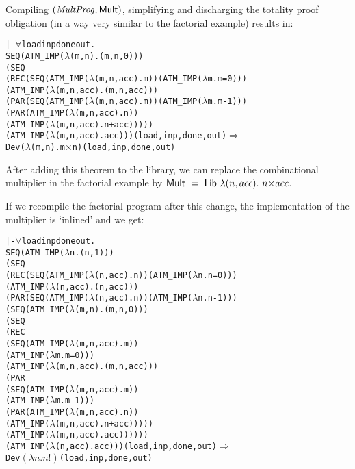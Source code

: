 \documentclass{llncs}
\begin{document}
Compiling $(\mathit{MultProg},\mathsf{Mult})$, simplifying and discharging
the totality proof obligation (in a way very similar to the factorial example) results in:

\vspace*{-2mm}

{\small\begin{alltt}
 |- \(\forall\)load inp done out.
      SEQ (ATM_IMP (\(\lambda\)(m,n). (m,n,0)))
        (SEQ
           (REC (SEQ (ATM_IMP (\(\lambda\)(m,n,acc). m)) (ATM_IMP (\(\lambda\)m. m = 0)))
              (ATM_IMP (\(\lambda\)(m,n,acc). (m,n,acc)))
              (PAR (SEQ (ATM_IMP (\(\lambda\)(m,n,acc). m)) (ATM_IMP (\(\lambda\)m. m - 1)))
                 (PAR (ATM_IMP (\(\lambda\)(m,n,acc). n))
                    (ATM_IMP (\(\lambda\)(m,n,acc). n {+} acc)))))
           (ATM_IMP (\(\lambda\)(m,n,acc). acc))) (load,inp,done,out) \(\Rightarrow\)
      Dev (\(\lambda\)(m,n). m \(\times\) n) (load,inp,done,out)
\end{alltt}}

\vspace*{-2mm}

\noindent After adding this theorem to the library, we can replace
the combinational multiplier in the factorial example by
$\mathsf{Mult}~=~\mathsf{Lib}~\lambda (n,acc).~ n{\times}acc$.

If we recompile the factorial program after this change, the
implementation of the multiplier is `inlined' and we get:



{\small\begin{alltt}
 |- \(\forall\)load inp done out.
      SEQ (ATM_IMP (\(\lambda\)n. (n,1)))
        (SEQ
           (REC (SEQ (ATM_IMP (\(\lambda\)(n,acc). n)) (ATM_IMP (\(\lambda\)n. n = 0)))
              (ATM_IMP (\(\lambda\)(n,acc). (n,acc)))
              (PAR (SEQ (ATM_IMP (\(\lambda\)(n,acc). n)) (ATM_IMP (\(\lambda\)n. n - 1)))
                 (SEQ (ATM_IMP (\(\lambda\)(m,n). (m,n,0)))
                    (SEQ
                       (REC
                          (SEQ (ATM_IMP (\(\lambda\)(m,n,acc). m))
                             (ATM_IMP (\(\lambda\)m. m = 0)))
                          (ATM_IMP (\(\lambda\)(m,n,acc). (m,n,acc)))
                          (PAR
                             (SEQ (ATM_IMP (\(\lambda\)(m,n,acc). m))
                                (ATM_IMP (\(\lambda\)m. m - 1)))
                             (PAR (ATM_IMP (\(\lambda\)(m,n,acc). n))
                                (ATM_IMP (\(\lambda\)(m,n,acc). n {+} acc)))))
                       (ATM_IMP (\(\lambda\)(m,n,acc). acc))))))
           (ATM_IMP (\(\lambda\)(n,acc). acc))) (load,inp,done,out) \(\Rightarrow\)
      Dev \(({\lambda}n. n!)\) (load,inp,done,out)
\end{alltt}}
\end{document}
